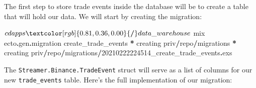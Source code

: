 \documentclass[
  oneside]{book}
\newenvironment{Shaded}{\begin{snugshade}}{\end{snugshade}}
\newcommand{\DecValTok}[1]{\textcolor[rgb]{0.00,0.00,0.81}{#1}}
\newcommand{\NormalTok}[1]{#1}
\newcommand{\OperatorTok}[1]{\textcolor[rgb]{0.81,0.36,0.00}{\textbf{#1}}}
\begin{document}
The first step to store trade events inside the database will be to create a table that will hold our data. We will start by creating the migration:

\begin{Shaded}
\begin{Highlighting}[]
\NormalTok{$ cd apps}\OperatorTok{/}\NormalTok{data\_warehouse}
\NormalTok{$ mix ecto}\OperatorTok{.}\NormalTok{gen}\OperatorTok{.}\NormalTok{migration create\_trade\_events}
\OperatorTok{*}\NormalTok{ creating priv}\OperatorTok{/}\NormalTok{repo}\OperatorTok{/}\NormalTok{migrations}
\OperatorTok{*}\NormalTok{ creating priv}\OperatorTok{/}\NormalTok{repo}\OperatorTok{/}\NormalTok{migrations}\OperatorTok{/}\DecValTok{20210222224514}\NormalTok{\_create\_trade\_events}\OperatorTok{.}\NormalTok{exs}
\end{Highlighting}
\end{Shaded}

The \texttt{Streamer.Binance.TradeEvent} struct will serve as a list of columns for our new \texttt{trade\_events} table. Here's the full implementation of our migration:
\end{document}
